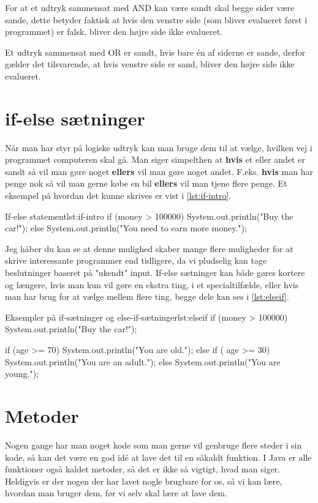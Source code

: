 {\begin{remark}
	For at et udtryk sammensat med AND kan være sandt skal begge sider være sande, dette betyder faktisk at hvis den venstre side (som bliver evalueret først i programmet) er falsk, bliver den højre side ikke evalueret.
	
	Et udtryk sammensat med OR er sandt, hvis bare én af siderne er sande, derfor gælder det tilsvarende, at hvis venstre side er sand, bliver den højre side ikke evalueret.
\end{remark}

\section{if-else sætninger}
Når man har styr på logiske udtryk kan man bruge dem til at vælge, hvilken vej i programmet computeren skal gå. Man siger simpelthen at \textbf{hvis} et eller andet er sandt så vil man gøre noget \textbf{ellers} vil man gøre noget andet. F.eks. \textbf{hvis} man har penge nok så vil man gerne købe en bil \textbf{ellers} vil man tjene flere penge. Et eksempel på hvordan det kunne skrives er vist i \autoref{lst:if-intro}.

\begin{JavaCode}{If-else statement}{lst:if-intro}
	if (money > 100000) {
		System.out.println("Buy the car!");
	} else {
		System.out.println("You need to earn more money.");
	}
\end{JavaCode}

Jeg håber du kan se at denne mulighed skaber mange flere muligheder for at skrive interessante programmer end tidligere, da vi pludselig kan tage beslutninger baseret på "ukendt" input. If-else sætninger kan både gøres kortere og længere, hvis man kun vil gøre en ekstra ting, i et specialtilfælde, eller hvis man har brug for at vælge mellem flere ting, begge dele kan ses i \autoref{lst:elseif}.

\begin{JavaCode}{Eksempler på if-sætninger og else-if-sætninger}{lst:elseif}
	if (money > 100000) {
		System.out.println("Buy the car!");
	}
	
	if (age >= 70) {
		System.out.println("You are old.");
	} else if ( age >= 30) {
		System.out.println("You are an adult.");
	} else {
		System.out.println("You are young.");
	}
\end{JavaCode}

\section{Metoder}
Nogen gange har man noget kode som man gerne vil genbruge flere steder i sin kode, så kan det være en god idé at lave det til en såkaldt funktion. I Java er alle funktioner også kaldet metoder, så det er ikke så vigtigt, hvad man siger. Heldigvis er der nogen der har lavet nogle brugbare for os, så vi kan lære, hvordan man bruger dem, før vi selv skal lære at lave dem. 

}
